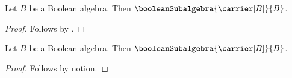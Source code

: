 

\begin{classification}\label{notion_prefix_predicate_conclusion}
    Let $B$ be a Boolean algebra.
    Then $\booleanSubalgebra{\carrier[B]}{B}$.
\end{classification}
\begin{proof}
    Follows by .
\end{proof}

\begin{proposition}\label{notion_prefix_predicate_conclusion_consumer}
    Let $B$ be a Boolean algebra.
    Then $\booleanSubalgebra{\carrier[B]}{B}$.
\end{proposition}
\begin{proof}
    Follows by notion.
\end{proof}
